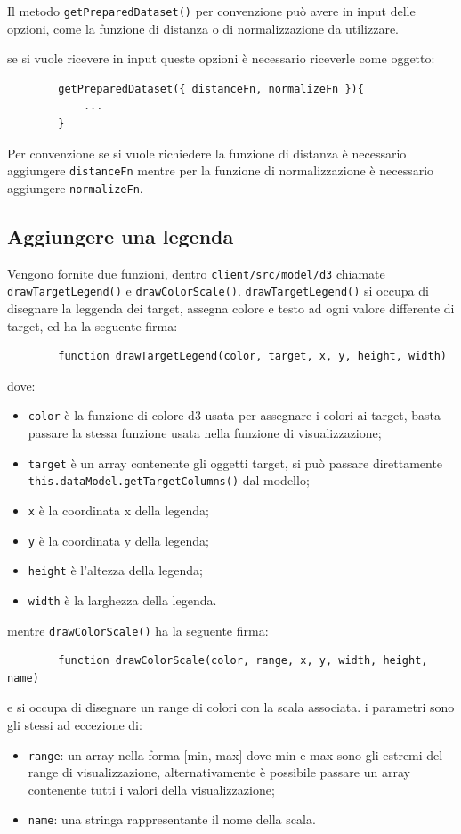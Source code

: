     Il metodo \texttt{getPreparedDataset()} per convenzione può avere in input delle opzioni, come la funzione di distanza o di normalizzazione da utilizzare.
    
    se si vuole ricevere in input queste opzioni è necessario riceverle come oggetto:
    
    \begin{verbatim}
        getPreparedDataset({ distanceFn, normalizeFn }){
            ...
        }
    \end{verbatim}
    Per convenzione se si vuole richiedere la funzione di distanza è necessario aggiungere \texttt{distanceFn} mentre per la funzione di normalizzazione è necessario aggiungere \texttt{normalizeFn}.
    
    \subsection{Aggiungere una legenda}
    Vengono fornite due funzioni, dentro \texttt{client/src/model/d3}
    chiamate \texttt{drawTargetLegend()} e \texttt{drawColorScale()}.
    \texttt{drawTargetLegend()} si occupa di disegnare la leggenda dei target, assegna colore e testo ad ogni valore differente di target, ed ha la seguente firma:
    \begin{verbatim}
        function drawTargetLegend(color, target, x, y, height, width) 
    \end{verbatim}
    dove:
    \begin{itemize}
        \item \texttt{color} è la funzione di colore d3 usata per assegnare i colori ai target, basta passare la stessa funzione usata nella funzione di visualizzazione;
        \item \texttt{target} è un array contenente gli oggetti target, si può passare direttamente\\\texttt{this.dataModel.getTargetColumns()} dal modello;
        \item \texttt{x} è la coordinata x della legenda;
        \item \texttt{y} è la coordinata y della legenda;
        \item \texttt{height} è l'altezza della legenda;
        \item \texttt{width} è la larghezza della legenda.
    \end{itemize}
    mentre \texttt{drawColorScale()} ha la seguente firma:
    \begin{verbatim}
        function drawColorScale(color, range, x, y, width, height, name)
    \end{verbatim}
    e si occupa di disegnare un range di colori con la scala associata. i parametri sono gli stessi ad eccezione di:
    \begin{itemize}
        \item \texttt{range}: un array nella forma [min, max] dove min e max sono gli estremi del range di visualizzazione, alternativamente è possibile passare un array contenente tutti i valori della visualizzazione;
        \item \texttt{name}: una stringa rappresentante il nome della scala.
    \end{itemize}